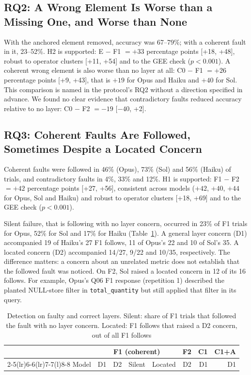 \documentclass[conference]{IEEEtran}
\newcommand{\id}[1]{\texttt{#1}}
\begin{document}
\subsection{RQ2: A Wrong Element Is Worse than a Missing One, and Worse than None}

With the anchored element removed, accuracy was 67--79\%; with a coherent fault in it, 23--52\%. H2 is supported: E $-$ F1 $= +33$ percentage points [+18, +48], robust to operator clusters [+11, +54] and to the GEE check ($p < 0.001$). A coherent wrong element is also worse than no layer at all: C0 $-$ F1 $= +26$ percentage points [+9, +43], that is $+19$ for Opus and Haiku and $+40$ for Sol. This comparison is named in the protocol's RQ2 without a direction specified in advance. We found no clear evidence that contradictory faults reduced accuracy relative to no layer: C0 $-$ F2 $= -19$ [$-40$, +2].

\subsection{RQ3: Coherent Faults Are Followed, Sometimes Despite a Located Concern}

Coherent faults were followed in 46\% (Opus), 73\% (Sol) and 56\% (Haiku) of trials, and contradictory faults in 4\%, 33\% and 12\%. H1 is supported: F1 $-$ F2 $= +42$ percentage points [+27, +56], consistent across models ($+42$, $+40$, $+44$ for Opus, Sol and Haiku) and robust to operator clusters [+18, +69] and to the GEE check ($p < 0.001$).

Silent failure, that is following with no layer concern, occurred in 23\% of F1 trials for Opus, 52\% for Sol and 17\% for Haiku (Table~\ref{tab:detection}). A general layer concern (D1) accompanied 19 of Haiku's 27 F1 follows, 11 of Opus's 22 and 10 of Sol's 35. A located concern (D2) accompanied 14/27, 9/22 and 10/35, respectively. The difference matters: a concern about an unrelated metric does not establish that the followed fault was noticed. On F2, Sol raised a located concern in 12 of its 16 follows. For example, Opus's Q06 F1 response (repetition 1) described the planted NULL-store filter in \id{total\_quantity} but still applied that filter in its query.

\begin{table}[t]
\caption{Detection on faulty and correct layers. Silent: share of F1 trials that followed the fault with no layer concern. Located: F1 follows that raised a D2 concern, out of all F1 follows}
\label{tab:detection}
\centering
\footnotesize
\setlength{\tabcolsep}{3pt}
\begin{tabular}{@{}lrrrrrrr@{}}
\toprule
& \multicolumn{4}{c}{F1 (coherent)} & F2 & C1 & C1+A \\
\cmidrule(lr){2-5}\cmidrule(lr){6-6}\cmidrule(lr){7-7}\cmidrule(l){8-8}
Model & D1 & D2 & Silent & Located & D2 & D1 & D1 \\
\midrule

\end{tabular}
\end{table}
\end{document}
